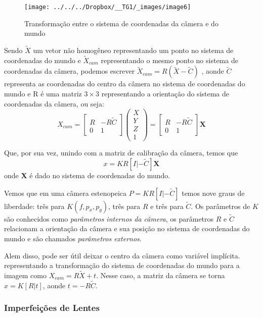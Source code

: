 \documentclass[ecp,tc]{iiufrgs}
\begin{document}
\begin{figure}
	\centering
	\caption{Transformação entre o sistema de coordenadas da câmera e do mundo}
	\texttt{[image: ../../../Dropbox/\_\_TG1/\_images/image6]}
	\label{fig:image6}
\end{figure}

Sendo $ \widetilde{X} $ um vetor não homogêneo representando um ponto no sistema de coordenadas do mundo e $ \widetilde{X}_{cam} $ representando o mesmo ponto no sistema de coordenadas da câmera, podemos escrever $ \widetilde{X}_{cam} = R(\widetilde{X} - \widetilde{C}) $ , aonde $ \widetilde{C} $ representa as coordenadas do centro da câmera no sistema de coordenadas do mundo e R é uma matriz $ 3 \times 3 $ representando a orientação do sistema de coordenadas da câmera, ou seja:
\[ X_{cam} =
\begin{bmatrix} R & -R\widetilde{C} \\ 
0 & 1 \end{bmatrix}
\begin{pmatrix} X \\ Y \\ Z \\ 1 \end{pmatrix} =
\begin{bmatrix} R & -R\widetilde{C} \\ 
0 & 1 \end{bmatrix}
\textbf{X}  \]

Que, por sua vez, unindo com a matriz de calibração da câmera, temos que \[x = KR[I|-\widetilde{C}]\textbf{X} \] onde \textbf{X} é dado no sistema de coordenadas do mundo.

Vemos que em uma câmera estenopeica $ P = KR[I|-\widetilde{C}] $ temos nove graus de liberdade: três para $ K(f, p_x, p_y) $, três para $ R $ e três para $ \widetilde{C} $. Os parâmetros de $K$ são conhecidos como \textit{parâmetros internos da câmera}, os
parâmetros $R$ e $\widetilde{C}$ relacionam a orientação da câmera e sua posição no sistema de coordenadas do mundo e são chamados \textit{parâmetros externos}.

Alem disso, pode ser útil deixar o centro da câmera como variável implícita. representando a transformação do sistema de coordenadas do mundo para a imagem como $ X_{cam} = R\widetilde{X} + t $. Nesse caso, a matriz da câmera se torna $ x = K[R|t] $, aonde $ t = -R\widetilde{C} $.

\subsubsection{Imperfeições de Lentes}
\end{document}
